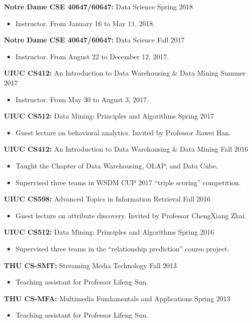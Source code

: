 \documentclass[margin, 9pt]{res}
\begin{document}
\begin{resume}
{\textbf{Notre Dame CSE 40647/60647:} Data Science} \hfill{Spring 2018}
\begin{itemize}
\item Instructor. From January 16 to May 11, 2018.
\end{itemize}
\vspace{-0.1in}
{\textbf{Notre Dame CSE 40647/60647:} Data Science} \hfill{Fall 2017}
\begin{itemize}
\item Instructor. From August 22 to December 12, 2017.
\end{itemize}
\vspace{-0.1in}
{\textbf{UIUC CS412:} An Introduction to Data Warehousing \& Data Mining} \hfill{Summer 2017}
\begin{itemize}
\item Instructor. From May 30 to August 3, 2017.
\end{itemize}
\vspace{-0.1in}
{\textbf{UIUC CS512:} Data Mining: Principles and Algorithms} \hfill{Spring 2017}
\begin{itemize}
\item Guest lecture on behavioral analytics. Invited by Professor Jiawei Han.
\end{itemize}
\vspace{-0.1in}
{\textbf{UIUC CS412:} An Introduction to Data Warehousing \& Data Mining} \hfill{Fall 2016}
\begin{itemize}
\item Taught the Chapter of Data Warehousing, OLAP, and Data Cube.
\item Supervised three teams in WSDM CUP 2017 ``triple scoring'' competition.
\end{itemize}
\vspace{-0.1in}
{\textbf{UIUC CS598:} Advanced Topics in Information Retrieval} \hfill{Fall 2016}
\begin{itemize}
\item Guest lecture on attribute discovery. Invited by Professor ChengXiang Zhai.
\end{itemize}
\vspace{-0.1in}
{\textbf{UIUC CS512:} Data Mining: Principles and Algorithms} \hfill{Spring 2016}
\begin{itemize}
\item Supervised three teams in the ``relationship prediction'' course project.
\end{itemize}
\vspace{-0.1in}
{\textbf{THU CS-SMT:} Streaming Media Technology} \hfill{Fall 2013}
\begin{itemize}
\item Teaching assistant for Professor Lifeng Sun.
\end{itemize}
\vspace{-0.1in}
{\textbf{THU CS-MFA:} Multimedia Fundamentals and Applications} \hfill{Spring 2013}
\begin{itemize}
\item Teaching assistant for Professor Lifeng Sun.
\end{itemize}


\end{resume}
\end{document}
